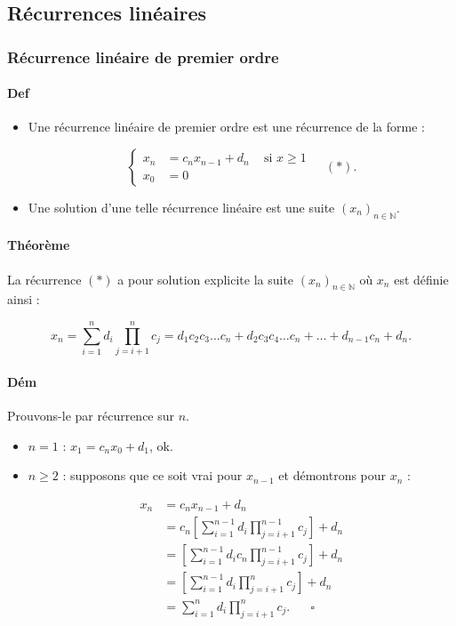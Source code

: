 \documentclass{article}
\newenvironment{lst}
	{\begin{minipage}[t]{.9\linewidth}\begin{itemize}}
	{\end{itemize}\end{minipage}}
\begin{document}
		\subsection{Récurrences linéaires}
			\subsubsection{Récurrence linéaire de premier ordre}

			\paragraph{Def}
			\begin{lst}
				\item Une récurrence linéaire de premier ordre est une récurrence de la forme :

				\[\left\{\begin{aligned}
					x_n &= c_n x_{n-1} + d_n \;\;\;\text{ si $x \geq 1$} \\
					x_0 &= 0
				\end{aligned}\right.\;\;\;\;(*).\]

				\item Une solution d'une telle récurrence linéaire est une suite $(x_n)_{n \in \mathbb N}$.
			\end{lst}

			\paragraph{Théorème} La récurrence $(*)$ a pour solution explicite la suite $(x_n)_{n \in \mathbb N}$ où $x_n$ est définie ainsi :

			\[x_n = \sum_{i=1}^nd_i\prod_{j=i+1}^nc_j = d_1c_2c_3 \ldots c_n + d_2c_3c_4 \ldots c_n + \ldots + d_{n-1}c_n + d_n.\]

			\paragraph{Dém} Prouvons-le par récurrence sur $n$.

			\begin{itemize}
				\item $n  =  1$  : $x_1 = c_n x_0 + d_1$, ok.
				\item $n \geq 2$ : supposons que ce soit vrai pour $x_{n-1}$ et démontrons pour $x_n$ :

					  \[\begin{aligned}
						x_n &= c_nx_{n-1} + d_n \\
							&= c_n \left[\sum_{i=1}^{n-1}d_i\prod_{j=i+1}^{n-1}c_j\right] + d_n \\
							&= \left[\sum_{i=1}^{n-1}d_ic_n\prod_{j=i+1}^{n-1}c_j\right] + d_n \\
							&= \left[\sum_{i=1}^{n-1}d_i\prod_{j=i+1}^nc_j\right] + d_n \\
							&= \sum_{i=1}^nd_i\prod_{j=i+1}^nc_j.\;\;\;\;\;\;\square
					  \end{aligned}\]
			\end{itemize}
\end{document}
